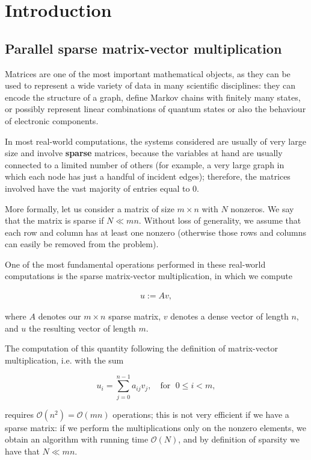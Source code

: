 \chapter{Introduction} \label{chap:introduction}
\section{Parallel sparse matrix-vector multiplication} \label{sec:par_matvec}
Matrices are one of the most important mathematical objects, as they can be used to represent a wide variety of data in many scientific disciplines: they can encode the structure of a graph, define Markov chains with finitely many states, or possibly represent linear combinations of quantum states or also the behaviour of electronic components. 

In most real-world computations, the systems considered are usually of very large size and involve \textbf{sparse} matrices, because the variables at hand are usually connected to a limited number of others (for example, a very large graph in which each node has just a handful of incident edges); therefore, the matrices involved have the vast majority of entries equal to 0.

More formally, let us consider a matrix of size $m \times n$ with $N$ nonzeros. We say that the matrix is sparse if $ N \ll mn $. Without loss of generality, we assume that each row and column has at least one nonzero (otherwise those rows and columns can easily be removed from the problem).

One of the most fundamental operations performed in these real-world computations is the sparse matrix-vector multiplication, in which we compute

\begin{align}
	u:=Av,
	\label{uAv}
\end{align}

where $A$ denotes our $m \times n$ sparse matrix, $v$ denotes a dense vector of length $n$, and $u$ the resulting vector of length $m$.

The computation of this quantity following the definition of matrix-vector multiplication, i.e. with the sum 

\[ 
	u_i = \sum_{j=0}^{n-1} a_{ij} v_j, \quad \text{for }\; 0 \leq i < m,
\]

requires $\mathcal{O}(n^2) = \mathcal{O}(mn)$ operations; this is not very efficient if we have a sparse matrix: if we perform the multiplications only on the nonzero elements, we obtain an algorithm with running time $\mathcal{O}(N)$, and by definition of sparsity we have that $N \ll mn$.

